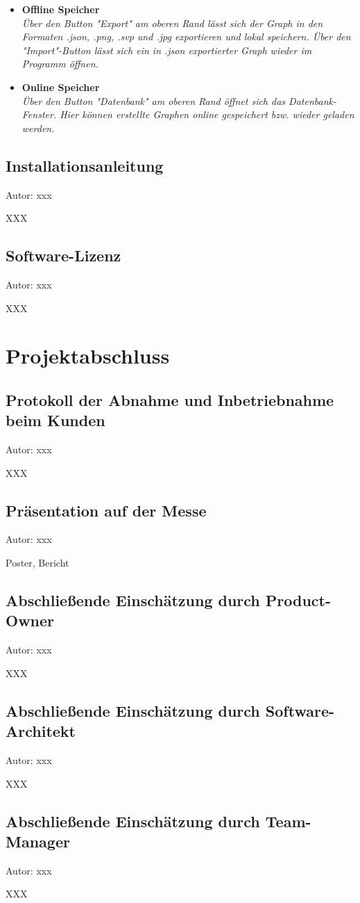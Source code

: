 \documentclass[twoside]{report}
\begin{document}
\begin{itemize}
  \item \textbf{ Offline Speicher }
    \\\textit{ 
      Über den Button "Export" am oberen Rand lässt sich der Graph in den Formaten .json, .png, .svp und .jpg exportieren und lokal speichern. Über den "Import"-Button lässt sich ein in .json exportierter Graph wieder im Programm öffnen. }
  \item \textbf{ Online Speicher }
    \\\textit{
      Über den Button "Datenbank" am oberen Rand öffnet sich das Datenbank-Fenster. Hier können erstellte Graphen online gespeichert bzw. wieder geladen werden. }
\end{itemize}

\subsection{Installationsanleitung}
{\small Autor: xxx}

XXX

\subsection{Software-Lizenz}
{\small Autor: xxx}

XXX


\section{Projektabschluss}

\subsection{Protokoll der Abnahme und Inbetriebnahme beim Kunden}
{\small Autor: xxx}

XXX

\subsection{Präsentation auf der Messe}
{\small Autor: xxx}

Poster, Bericht

\subsection{Abschließende Einschätzung durch Product-Owner}
{\small Autor: xxx}

XXX

\subsection{Abschließende Einschätzung durch Software-Architekt}
{\small Autor: xxx}

XXX

\subsection{Abschließende Einschätzung durch Team-Manager}
{\small Autor: xxx}

XXX
\end{document}
